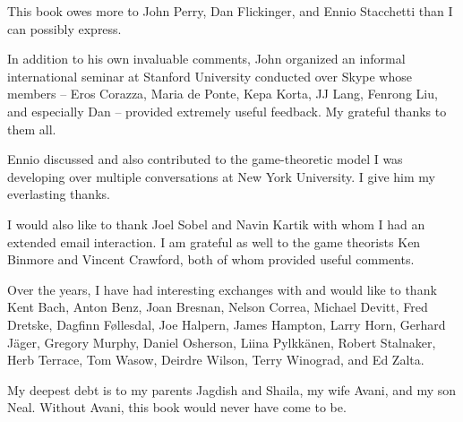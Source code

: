 \addchap{\lsAcknowledgementTitle}
This book owes more to John Perry, Dan Flickinger, and Ennio Stacchetti than I can possibly express. 

In addition to his own invaluable comments, John organized an informal international seminar at Stanford University conducted over Skype whose members -- Eros Corazza,  Maria de Ponte, Kepa Korta, JJ Lang, Fenrong Liu, and especially Dan -- provided extremely useful feedback. My grateful thanks to them all.

Ennio discussed and also contributed to the game-theoretic model I was developing over multiple conversations at New York University. I give him my everlasting thanks.

I would also like to thank Joel Sobel and Navin Kartik with whom I had an extended email interaction. I am grateful as well to the game theorists Ken Binmore and Vincent Crawford, both of whom provided useful comments.

Over the years, I have had interesting exchanges with and would like to thank Kent Bach, Anton Benz, Joan Bresnan, Nelson Correa, Michael Devitt, Fred Dretske, Dagfinn F{\o}llesdal, Joe Halpern, James Hampton, Larry Horn, Gerhard J\"{a}ger, Gregory Murphy, Daniel Osherson, Liina Pylkk\"{a}nen, Robert Stalnaker, Herb Terrace, Tom Wasow, Deirdre Wilson, Terry Winograd, and Ed Zalta.

My deepest debt is to my parents Jagdish and Shaila, my wife Avani, and my son Neal. Without Avani, this book would never have come to be.
